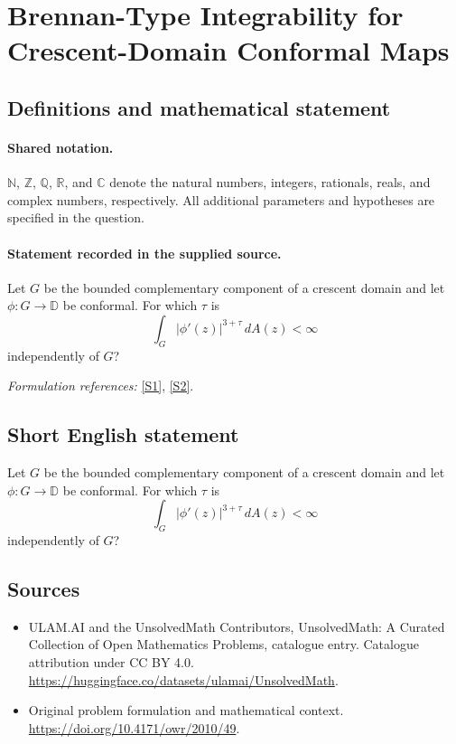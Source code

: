 \documentclass[11pt]{article}
\newcommand{\sref}[2]{\hyperlink{source:#1:#2}{[S#2]}}
\begin{document}
\section{Brennan-Type Integrability for Crescent-Domain Conformal Maps}\label{statement}

\subsection{Definitions and mathematical statement}

\paragraph{Shared notation.}$\mathbb N$, $\mathbb Z$, $\mathbb Q$, $\mathbb R$, and $\mathbb C$ denote the natural numbers, integers, rationals, reals, and complex numbers, respectively. All additional parameters and hypotheses are specified in the question.


\paragraph{Statement recorded in the supplied source.}
Let $G$ be the bounded complementary component of a crescent domain and let $\phi:G\to\mathbb D$ be conformal. For which $\tau$ is $$\int_G|\phi'(z)|^{3+\tau}\,dA(z)<\infty$$ independently of $G$?
\par\smallskip\textit{Formulation references:} \sref{statement}{1}, \sref{statement}{2}.
\subsection{Short English statement}
Let $G$ be the bounded complementary component of a crescent domain and let $\phi:G\to\mathbb D$ be conformal. For which $\tau$ is $$\int_G|\phi'(z)|^{3+\tau}\,dA(z)<\infty$$ independently of $G$?
\subsection{Sources}
\begin{itemize}
\item[\hypertarget{source:statement:1}{S1}] ULAM.AI and the UnsolvedMath Contributors, UnsolvedMath: A Curated Collection of Open Mathematics Problems, catalogue entry. Catalogue attribution under CC BY 4.0.
\url{https://huggingface.co/datasets/ulamai/UnsolvedMath}.
\item[\hypertarget{source:statement:2}{S2}] Original problem formulation and mathematical context.
\url{https://doi.org/10.4171/owr/2010/49}.
\end{itemize}
\label{end:statement}
\end{document}
